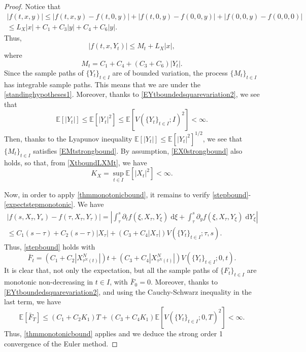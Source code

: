 \documentclass[reqno,12pt]{amsart}
\theoremstyle{plain}%
\theoremstyle{definition}
\begin{document}
\begin{proof}
    Notice that
    \begin{multline*}
        |f(t, x, y)| \leq |f(t, x, y) - f(t, 0, y)| + |f(t, 0, y) - f(0, 0, y)| + |f(0, 0, y) - f(0, 0, 0)| \\
        \leq L_X |x| + C_1 + C_3|y| + C_4 + C_6|y|. 
    \end{multline*}
    Thus,
    \[
        |f(t, x, Y_t)| \leq M_t + L_X |x|,
    \]
    where
    \[
        M_t = C_1 + C_4 + (C_3 + C_6)|Y_t|.
    \]
    Since the sample paths of $\{Y_t\}_{t\in I}$ are of bounded variation, the process $\{M_t\}_{t\in I}$ has integrable sample paths. This means that we are under the \cref{standinghypotheses1}. Moreover, thanks to \eqref{EYtboundedsquarevariation2}, we see that
    \[
        \mathbb{E}[|Y_t|] \leq \mathbb{E}[|Y_t|^2] \leq \mathbb{E}[V(\{Y_t\}_{t\in I}; I)^2] < \infty.
    \]
    Then, thanks to the Lyapunov inequality $\mathbb{E}[|Y_t|] \leq \mathbb{E}[|Y_t|^2]^{1/2}$, we see that $\{M_t\}_{t\in I}$ satisfies \eqref{EMtstrongbound}. By assumption, \eqref{EX0strongbound} also holds, so that, from \eqref{XtboundLXMt}, we have
    \[
        K_X = \sup_{t\in I}\mathbb{E}[|X_t|^2] < \infty.
    \]

    Now, in order to apply \cref{thmmonotonicbound}, it remains to verify \eqref{stepbound}-\eqref{expectstepmonotonic}. We have
    \begin{multline*}
        |f(s, X_\tau, Y_s) - f(\tau, X_\tau, Y_\tau)| = \left|\int_\tau^s \partial_t f(\xi, X_\tau, Y_\xi) \;\mathrm{d}\xi + \int_\tau^s \partial_y f(\xi, X_\tau, Y_\xi) \;\mathrm{d}Y_\xi\right| \\
        \leq C_1 (s-\tau) + C_2(s-\tau) |X_\tau| + (C_3 + C_4 |X_\tau|) V(\{Y_t\}_{t\in I}; \tau, s).
    \end{multline*}
    Thus, \eqref{stepbound} holds with
    \[
        \bar F_t = (C_1 + C_2 |X_{\tau^N(t)}^N|)t + (C_3 + C_4 |X_{\tau^N(t)}^N|) V(\{Y_t\}_{t\in I}; 0, t).
    \]
    It is clear that, not only the expectation, but all the sample paths of $\{F_t\}_{t\in I}$ are monotonic non-decreasing in $t\in I$, with $\bar F_0 = 0$. Moreover, thanks to \eqref{EYtboundedsquarevariation2}, and using the Cauchy-Schwarz inequality in the last term, we have
    \[
        \mathbb{E}[\bar F_T] \leq (C_1 + C_2 K_1)T + (C_3 + C_4K_1)\mathbb{E}[V(\{Y_t\}_{t\in I}; 0, T)^2] < \infty.
    \]
    Thus, \cref{thmmonotonicbound} applies and we deduce the strong order 1 convergence of the Euler method.
\end{proof}
\end{document}

